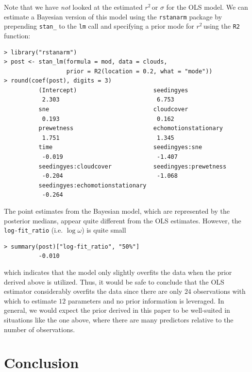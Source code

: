 \documentclass[11pt]{article}
\newcommand{\Rsq}{$r^2\,$}
\begin{document}
Note that we have \emph{not} looked at the estimated \Rsq or $\sigma$ for the
OLS model. We can estimate a Bayesian version of this model using the
{\tt rstanarm} package by prepending {\tt stan\_} to the {\tt lm} call and
specifying a prior mode for \Rsq using the {\tt R2} function:

\vspace{.5cm}
\begin{lstlisting}[frame=lines]
> library("rstanarm")
> post <- stan_lm(formula = mod, data = clouds,
                  prior = R2(location = 0.2, what = "mode"))
> round(coef(post), digits = 3)
          (Intercept)                      seedingyes
           2.303                            6.753
          sne                              cloudcover
           0.193                            0.162
          prewetness                       echomotionstationary
           1.751                            1.345
          time                             seedingyes:sne
           -0.019                           -1.407
          seedingyes:cloudcover            seedingyes:prewetness
           -0.204                           -1.068
          seedingyes:echomotionstationary
           -0.264
\end{lstlisting}
\vspace{.5cm}


\noindent The point estimates from the Bayesian model, which are represented by the
posterior medians, appear quite different from the OLS estimates. However, the
{\tt log-fit\_ratio} (i.e. $\log{\omega}$) is quite small

\vspace{.5cm}
\begin{lstlisting}[frame=lines]
> summary(post)["log-fit_ratio", "50%"]
          -0.010
\end{lstlisting}
\vspace{.5cm}

\noindent which indicates that the model only slightly overfits the data when the prior
derived above is utilized. Thus, it would be safe to conclude that the OLS
estimator considerably overfits the data since there are only $24$ observations
with which to estimate $12$ parameters and no prior information is leveraged. In
general, we would expect the prior derived in this paper to be well-suited in
situations like the one above, where there are many predictors relative to the
number of observations.



\section{Conclusion}
\end{document}
